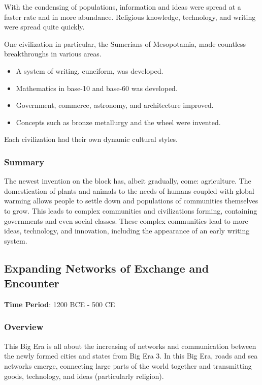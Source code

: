 \documentclass[11pt]{article}
\begin{document}
With the condensing of populations, information and ideas were spread at a faster rate and in more abundance. Religious knowledge, technology, and writing were spread quite quickly.

One civilization in particular, the Sumerians of Mesopotamia, made countless breakthroughs in various areas.

\begin{itemize}
\item A system of writing, cuneiform, was developed.
\item Mathematics in base-10 and base-60 was developed.
\item Government, commerce, astronomy, and architecture improved.
\item Concepts such as bronze metallurgy and the wheel were invented.
\end{itemize}

Each civilization had their own dynamic cultural styles.

\subsubsection{Summary}
\label{sec:orgdba0589}

The newest invention on the block has, albeit gradually, come: agriculture. The domestication of plants and animals to the needs of humans coupled with global warming allows people to settle down and populations of communities themselves to grow. This leads to complex communities and civilizations forming, containing governments and even social classes. These complex communities lead to more ideas, technology, and innovation, including the appearance of an early writing system.
\subsection{Expanding Networks of Exchange and Encounter}
\label{sec:org04677af}

\textbf{Time Period}: 1200 BCE - 500 CE

\subsubsection{Overview}
\label{sec:org5983b37}

This Big Era is all about the increasing of networks and communication between the newly formed cities and states from Big Era 3. In this Big Era, roads and sea networks emerge, connecting large parts of the world together and transmitting goods, technology, and ideas (particularly religion).
\end{document}
